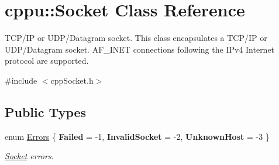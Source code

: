 \hypertarget{classcppu_1_1Socket}{}\section{cppu\+:\+:Socket Class Reference}
\label{classcppu_1_1Socket}


T\+C\+P/\+I\+P or U\+D\+P/\+Datagram socket. This class encapsulates a T\+C\+P/\+I\+P or U\+D\+P/\+Datagram socket. A\+F\+\_\+\+I\+N\+E\+T connections following the I\+Pv4 Internet protocol are supported.  




{\ttfamily \#include $<$cpp\+Socket.\+h$>$}

\subsection*{Public Types}
\begin{DoxyCompactItemize}
\item 
enum \hyperlink{classcppu_1_1Socket_a49ea5cb079bd7ae97ecf7eb30c9d9e5f}{Errors} \{ {\bfseries Failed} = -\/1, 
{\bfseries Invalid\+Socket} = -\/2, 
{\bfseries Unknown\+Host} = -\/3
 \}
\begin{DoxyCompactList}\small\item\em \hyperlink{classcppu_1_1Socket}{Socket} errors. \end{DoxyCompactList}\end{DoxyCompactItemize}
